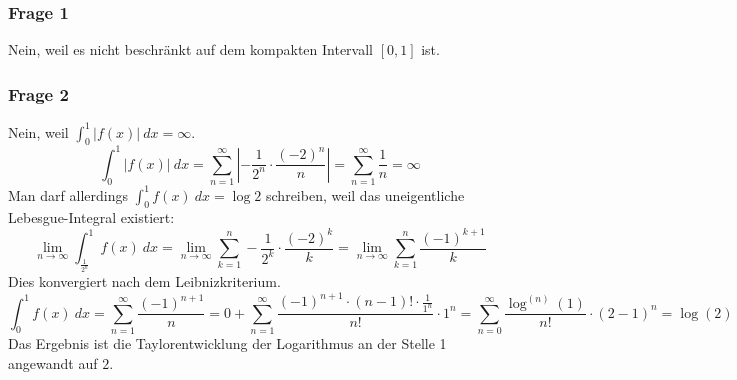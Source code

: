 \documentclass[10pt,a4paper]{article}
\begin{document}
\subsubsection{Frage 1}
Nein, weil es nicht beschränkt auf dem kompakten Intervall $[0, 1]$ ist.

\subsubsection{Frage 2}
Nein, weil $\int_{0}^{1} |f(x)|\ dx = \infty$.
\begin{equation}
  \int_{0}^{1} |f(x)|\ dx = \sum_{n = 1}^{\infty} |- \frac{1}{2^{n}} \cdot \frac{(-2)^{n}}{n}| = \sum_{n = 1}^{\infty} \frac{1}{n} = \infty
\end{equation}
Man darf allerdings $\int_{0}^{1} f(x)\ dx = \log 2$ schreiben, weil das uneigentliche Lebesgue-Integral existiert:
\begin{equation}
  \lim_{n \rightarrow \infty} \int_{\frac{1}{2^{n}}}^{1} f(x)\ dx = \lim_{n \rightarrow \infty} \sum_{k = 1}^{n} - \frac{1}{2^{k}} \cdot \frac{(-2)^{k}}{k} = \lim_{n \rightarrow \infty} \sum_{k = 1}^{n} \frac{(-1)^{k + 1}}{k}
\end{equation}
Dies konvergiert nach dem Leibnizkriterium.
\begin{equation}
  \int_{0}^{1} f(x)\ dx = \sum_{n = 1}^{\infty} \frac{(-1)^{n + 1}}{n} = 0 + \sum_{n = 1}^{\infty} \frac{(-1)^{n + 1} \cdot (n - 1)! \cdot \frac{1}{1^{n}}}{n!} \cdot 1^{n} = \sum_{n = 0}^{\infty} \frac{\log^{(n)}(1)}{n!} \cdot (2 - 1)^{n} = \log(2)
\end{equation}
Das Ergebnis ist die Taylorentwicklung der Logarithmus an der Stelle 1 angewandt auf $2$.
\end{document}
